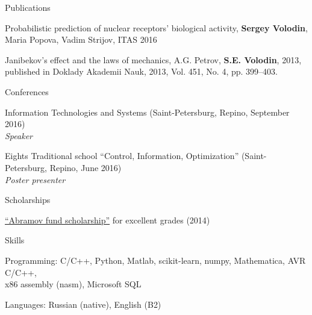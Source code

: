 \documentclass{resume} %
\begin{document}
\begin{rSection}{Publications}
\item Probabilistic prediction of nuclear receptors’ biological activity, {\bf Sergey Volodin}, Maria Popova, Vadim Strijov, ITAS 2016
\item Janibekov’s effect and the laws of mechanics, A.G. Petrov, {\bf S.E. Volodin}, 2013, published in Doklady Akademii Nauk, 2013, Vol. 451, No. 4, pp. 399–403.
\end{rSection}

\newpage

\begin{rSection}{Conferences}
\item Information Technologies and Systems (Saint-Petersburg, Repino, September 2016)\\
{\em Speaker}
\item Eights Traditional school “Control, Information, Optimization” (Saint-Petersburg, Repino, June 2016)\\
{\em Poster presenter}
\end{rSection}

\begin{rSection}{Scholarships}
\item \href{http://phystech-foundation.org/}{``Abramov fund scholarship''} for excellent grades (2014)
\end{rSection}

\begin{rSection}{Skills}
\item Programming: C/C++, Python, Matlab, scikit-learn, numpy, Mathematica, AVR C/C++,\\ x86 assembly (nasm), Microsoft SQL
\item Languages: Russian (native), English (B2)
\end{rSection}

\end{document}
